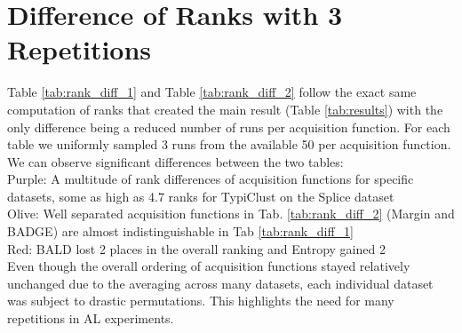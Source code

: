 \documentclass[]{article}
\begin{document}
\section{Difference of Ranks with 3 Repetitions}\label{app:rank_difference}
Table \ref{tab:rank_diff_1} and Table \ref{tab:rank_diff_2} follow the exact same computation of ranks that created the main result (Table \ref{tab:results}) with the only difference being a reduced number of runs per acquisition function.
For each table we uniformly sampled 3 runs from the available 50 per acquisition function. \\
We can observe significant differences between the two tables: \\
{\color{purple}Purple}: A multitude of rank differences of acquisition functions for specific datasets, some as high as 4.7 ranks for TypiClust on the Splice dataset \\
{\color{olive}Olive}: Well separated acquisition functions in Tab. \ref{tab:rank_diff_2} (Margin and BADGE) are almost indistinguishable in Tab \ref{tab:rank_diff_1} \\
{\color{red}Red}: BALD lost 2 places in the overall ranking and Entropy gained 2 \\ [1mm]
Even though the overall ordering of acquisition functions stayed relatively unchanged due to the averaging across many datasets, each individual dataset was subject to drastic permutations.
This highlights the need for many repetitions in AL experiments.
\end{document}
